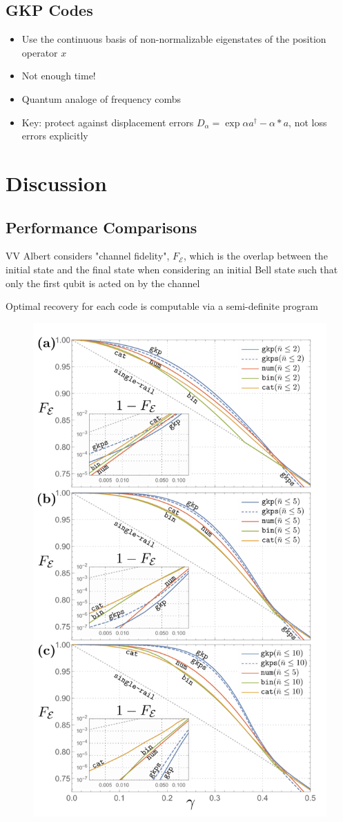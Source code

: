 \documentclass[12]{amsart}
\newcommand\0{\mathbf{0}}
\newcommand\<{\langle}
\renewcommand\>{\rangle}
\begin{document}
\subsection{GKP Codes}

\begin{itemize}
\item Use the continuous basis of non-normalizable eigenstates of the position operator $x$	
\item Not enough time!
\item Quantum analoge of frequency combs
\item Key: protect against displacement errors $D_\alpha = \exp{\alpha a^\dag  - \alpha* a}$, not loss errors explicitly
\end{itemize}

\section{Discussion}

\subsection{Performance Comparisons}

VV Albert considers "channel fidelity", $F_\mathcal{E}$, which is the overlap between the initial state and the final state when considering an initial Bell state such that only the first qubit is acted on by the channel

Optimal recovery for each code is computable via a semi-definite program

\begin{figure}[H]
\centering
\includegraphics[width=0.5\linewidth,keepaspectratio]{fidelity.png}	
\end{figure}
\end{document}
